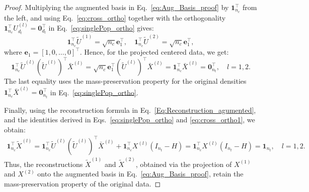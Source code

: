 \documentclass[10pt,a4paper]{amsart}
\begin{document}
\begin{proof}
Multiplying the augmented basis in Eq.~\eqref{eq:Aug_Basis_proof} by $\mathbf{1}_{n_c}^\top$ from the left, and using Eq.~\eqref{eq:cross_ortho} together with the orthogonality $\mathbf{1}_{n_c}^\top U^{(l)}_{d_l} = \mathbf{0}_{d_l}^\top$ in Eq.~\eqref{eq:singlePop_ortho} gives:
\begin{equation}
    \mathbf{1}_{n_c}^\top \tilde U^{(1)} = \sqrt{n_c} \mathbf{e}_1^\top, \quad
    \mathbf{1}_{n_c}^\top \tilde U^{(2)} = \sqrt{n_c} \mathbf{e}_1^\top,
\end{equation}
where $\mathbf{e}_1=[1,0,\ldots,0]^\top$. Hence, for the projected centered data, we get:
\begin{equation} \label{eq:cross_ortho1}
    \mathbf{1}_{n_c}^\top \tilde U^{(l)} (\tilde{U}^{(l)})^\top \bar X^{(l)} = \sqrt{n_c} \mathbf{e}_1^\top (\tilde{U}^{(l)})^\top \bar X^{(l)} = \mathbf{1}_{n_c}^\top \bar X^{(l)} = \mathbf{0}_{n_t}^\top,\quad l=1,2.
\end{equation}
The last equality uses the mass-preservation property for the original densities $ \mathbf{1}_{n_c}^\top \bar{X}^{(l)}=\boldsymbol{0}^\top_{n_t}$ in Eq.~\eqref{eq:singlePop_ortho}.

Finally, using the reconstruction formula in Eq.~\eqref{Eq:Reconstruction_agumented}, and the identities derived in Eqs.~\eqref{eq:singlePop_ortho} and \eqref{eq:cross_ortho1}, we obtain:
\begin{align}
\mathbf{1}^{\top}_{n_c}\tilde X^{(l)}=\mathbf{1}_{n_c}^\top \tilde U^{(l)} (\tilde{U}^{(l)})^\top \bar X^{(l)}+\mathbf{1}^{\top}_{n_c}  X^{(l)} (I_{n_t}-H)=\mathbf{1}^{\top}_{n_c}  X^{(l)}(I_{n_t}-H)=\mathbf{1}_{n_t},\quad l=1,2. 
\end{align}
Thus, the reconstructions $\tilde X^{(1)}$ and $\tilde X^{(2)}$, obtained via the projection of $X^{(1)}$ and $X^{(2)}$ onto the augmented basis in Eq.~\eqref{eq:Aug_Basis_proof}, retain the mass-preservation property of the original data.
\end{proof}
\end{document}
